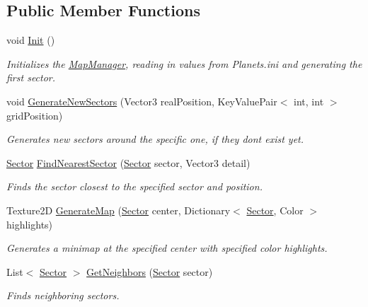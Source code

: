 \subsection*{Public Member Functions}
\begin{DoxyCompactItemize}
\item 
void \hyperlink{class_map_manager_a52cc3160cc0c90840920dda998a14de1}{Init} ()
\begin{DoxyCompactList}\small\item\em Initializes the \hyperlink{class_map_manager}{Map\+Manager}, reading in values from Planets.\+ini and generating the first sector. \end{DoxyCompactList}\item 
void \hyperlink{class_map_manager_aa880f73a5fdd3c8434cda8f1fba2deeb}{Generate\+New\+Sectors} (Vector3 real\+Position, Key\+Value\+Pair$<$ int, int $>$ grid\+Position)
\begin{DoxyCompactList}\small\item\em Generates new sectors around the specific one, if they don\textquotesingle{}t exist yet. \end{DoxyCompactList}\item 
\hyperlink{class_sector}{Sector} \hyperlink{class_map_manager_a491495d53fc51d72b6255a7171e05219}{Find\+Nearest\+Sector} (\hyperlink{class_sector}{Sector} sector, Vector3 detail)
\begin{DoxyCompactList}\small\item\em Finds the sector closest to the specified sector and position. \end{DoxyCompactList}\item 
Texture2\+D \hyperlink{class_map_manager_a335b65b22b46a6fe36642e76da4b727b}{Generate\+Map} (\hyperlink{class_sector}{Sector} center, Dictionary$<$ \hyperlink{class_sector}{Sector}, Color $>$ highlights)
\begin{DoxyCompactList}\small\item\em Generates a minimap at the specified center with specified color highlights. \end{DoxyCompactList}\item 
List$<$ \hyperlink{class_sector}{Sector} $>$ \hyperlink{class_map_manager_a53545e01b20a39cd61e40767bb74b17f}{Get\+Neighbors} (\hyperlink{class_sector}{Sector} sector)
\begin{DoxyCompactList}\small\item\em Finds neighboring sectors. \end{DoxyCompactList}\item 

\end{DoxyCompactItemize}
